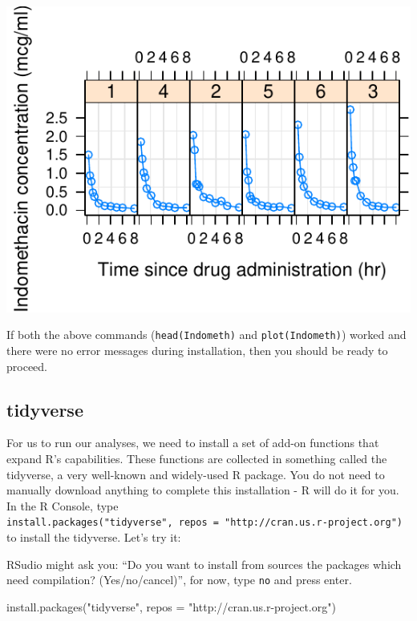 \documentclass[
]{krantz}
\newenvironment{Shaded}{\begin{snugshade}}{\end{snugshade}}
\newcommand{\AttributeTok}[1]{\textcolor[rgb]{0.77,0.63,0.00}{#1}}
\newcommand{\FunctionTok}[1]{\textcolor[rgb]{0.00,0.00,0.00}{#1}}
\newcommand{\NormalTok}[1]{#1}
\newcommand{\StringTok}[1]{\textcolor[rgb]{0.31,0.60,0.02}{#1}}
\begin{document}
\begin{center}\includegraphics{index_files/figure-latex/unnamed-chunk-6-1} \end{center}

If both the above commands (\texttt{head(Indometh)} and \texttt{plot(Indometh)}) worked and there were no error messages during installation, then you should be ready to proceed.

\hypertarget{tidyverse}{%
\subsection{tidyverse}\label{tidyverse}}

For us to run our analyses, we need to install a set of add-on functions that expand R's capabilities. These functions are collected in something called the tidyverse, a very well-known and widely-used R package. You do not need to manually download anything to complete this installation - R will do it for you. In the R Console, type \texttt{install.packages("tidyverse",\ repos\ =\ "http://cran.us.r-project.org")} to install the tidyverse. Let's try it:

RSudio might ask you: ``Do you want to install from sources the packages which need compilation? (Yes/no/cancel)'', for now, type \texttt{no} and press enter.

\begin{Shaded}
\begin{Highlighting}[]
\FunctionTok{install.packages}\NormalTok{(}\StringTok{"tidyverse"}\NormalTok{, }\AttributeTok{repos =} \StringTok{"http://cran.us.r{-}project.org"}\NormalTok{)}
\end{Highlighting}
\end{Shaded}
\end{document}
